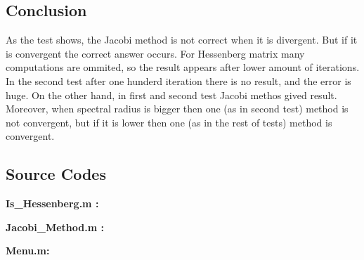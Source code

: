 \documentclass[12pt]{article}
\begin{document}
\begin{center}
\section{Conclusion}
\end{center}

\begin{flushleft}
As the test shows, the Jacobi method is not correct when it is divergent. But if it is convergent the correct answer occurs. For Hessenberg matrix many computations are ommited, so the result appears after lower amount of iterations. In the second test after one hunderd iteration there is no result, and the error is huge. On the other hand, in first and second test Jacobi methos gived result. Moreover, when spectral radius is bigger then one (as in second test) method is not convergent, but if it is lower then one (as in the rest of tests) method is convergent.
\end{flushleft}

\begin{center}
\item \section{Source Codes}
\end{center}

{\bf Is\_Hessenberg.m :}


\pagebreak

{\bf Jacobi\_Method.m :}


\pagebreak

{\bf Menu.m:}

\end{document}

